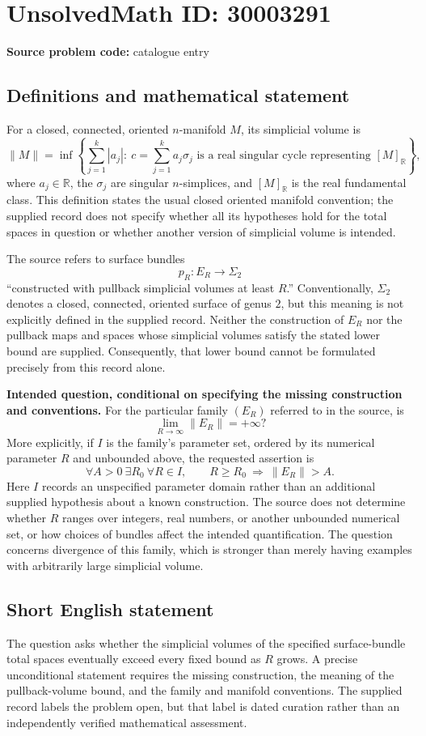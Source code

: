 \documentclass[11pt]{article}
\newcommand{\R}{\mathbb{R}}
\begin{document}
\section*{UnsolvedMath ID: 30003291}
\textbf{Source problem code:} catalogue entry
\subsection{Definitions and mathematical statement}
For a closed, connected, oriented \(n\)-manifold \(M\), its simplicial volume is
\[
\|M\|=\inf\left\{\sum_{j=1}^{k}|a_j|:\ c=\sum_{j=1}^{k}a_j\sigma_j\text{ is a real singular cycle representing }[M]_{\R}\right\},
\]
where \(a_j\in\R\), the \(\sigma_j\) are singular \(n\)-simplices, and \([M]_{\R}\) is the real fundamental class. This definition states the usual closed oriented manifold convention; the supplied record does not specify whether all its hypotheses hold for the total spaces in question or whether another version of simplicial volume is intended.

The source refers to surface bundles
\[
p_R:E_R\longrightarrow\Sigma_2
\]
``constructed with pullback simplicial volumes at least \(R\).'' Conventionally, \(\Sigma_2\) denotes a closed, connected, oriented surface of genus \(2\), but this meaning is not explicitly defined in the supplied record. Neither the construction of \(E_R\) nor the pullback maps and spaces whose simplicial volumes satisfy the stated lower bound are supplied. Consequently, that lower bound cannot be formulated precisely from this record alone.

\textbf{Intended question, conditional on specifying the missing construction and conventions.} For the particular family \((E_R)\) referred to in the source, is
\[
\lim_{R\to\infty}\|E_R\|=+\infty?
\]
More explicitly, if \(I\) is the family's parameter set, ordered by its numerical parameter \(R\) and unbounded above, the requested assertion is
\[
\forall A>0\ \exists R_0\ \forall R\in I,
\qquad R\ge R_0\ \Longrightarrow\ \|E_R\|>A.
\]
Here \(I\) records an unspecified parameter domain rather than an additional supplied hypothesis about a known construction. The source does not determine whether \(R\) ranges over integers, real numbers, or another unbounded numerical set, or how choices of bundles affect the intended quantification. The question concerns divergence of this family, which is stronger than merely having examples with arbitrarily large simplicial volume.
\subsection{Short English statement}
The question asks whether the simplicial volumes of the specified surface-bundle total spaces eventually exceed every fixed bound as \(R\) grows. A precise unconditional statement requires the missing construction, the meaning of the pullback-volume bound, and the family and manifold conventions. The supplied record labels the problem open, but that label is dated curation rather than an independently verified mathematical assessment.
\end{document}
